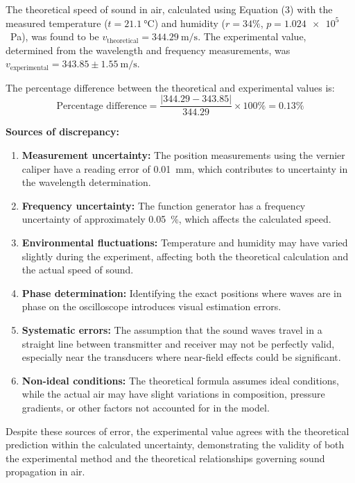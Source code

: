 \documentclass[12pt]{article}
\begin{document}
The theoretical speed of sound in air, calculated using Equation (3) with the measured temperature ($t = \SI{21.1}{\celsius}$) and humidity ($r = 34\%$, $p = \num{1.024e5}$~\si{\pascal}), was found to be $v_{\text{theoretical}} = 344.29~\si{\meter\per\second}$. The experimental value, determined from the wavelength and frequency measurements, was $v_{\text{experimental}} = 343.85 \pm 1.55~\si{\meter\per\second}$.

The percentage difference between the theoretical and experimental values is:
\begin{equation}
\text{Percentage difference} = \frac{|344.29 - 343.85|}{344.29} \times 100\% = 0.13\%
\end{equation}

\textbf{Sources of discrepancy:}
\begin{enumerate}[leftmargin=*]
\item \textbf{Measurement uncertainty:} The position measurements using the vernier caliper have a reading error of \SI{0.01}{\milli\meter}, which contributes to uncertainty in the wavelength determination.
\item \textbf{Frequency uncertainty:} The function generator has a frequency uncertainty of approximately \SI{0.05}{\percent}, which affects the calculated speed.
\item \textbf{Environmental fluctuations:} Temperature and humidity may have varied slightly during the experiment, affecting both the theoretical calculation and the actual speed of sound.
\item \textbf{Phase determination:} Identifying the exact positions where waves are in phase on the oscilloscope introduces visual estimation errors.
\item \textbf{Systematic errors:} The assumption that the sound waves travel in a straight line between transmitter and receiver may not be perfectly valid, especially near the transducers where near-field effects could be significant.
\item \textbf{Non-ideal conditions:} The theoretical formula assumes ideal conditions, while the actual air may have slight variations in composition, pressure gradients, or other factors not accounted for in the model.
\end{enumerate}

Despite these sources of error, the experimental value agrees with the theoretical prediction within the calculated uncertainty, demonstrating the validity of both the experimental method and the theoretical relationships governing sound propagation in air.
\end{document}
